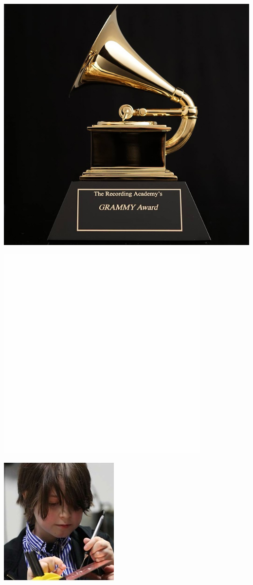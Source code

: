 \documentclass{article}
\begin{document}
\begin{multicols}{2}
\includegraphics[scale=0.35]{grammy}

\includegraphics[scale=0.1]{w}
\vfill


\includegraphics[scale=1]{prodigy}



\end{multicols}
\end{document}
